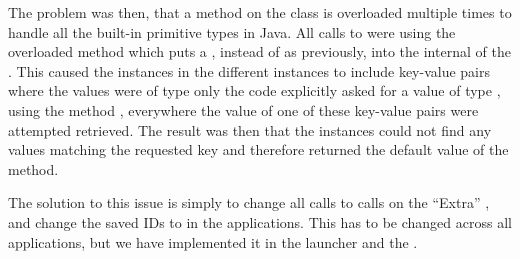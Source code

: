 The problem was then, that a method  on the  class is overloaded multiple times to handle all the built-in primitive types in Java. All calls to  were using the overloaded method which puts a , instead of  as previously, into the internal  of the . This caused the  instances in the different  instances to include key-value pairs where the values were of type  only the code explicitly asked for a value of type , using the method , everywhere the value of one of these key-value pairs were attempted retrieved. The result was then that the  instances could not find any  values matching the requested key and therefore returned the default value of the  method.     

The solution to this issue is simply to change all  calls to  calls on the ``Extra'' , and change the saved IDs to  in the applications. This has to be changed across all applications, but we have implemented it in the launcher and the \ct. 